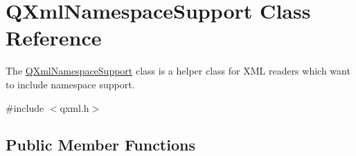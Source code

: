 \hypertarget{class_q_xml_namespace_support}{}\section{Q\+Xml\+Namespace\+Support Class Reference}
\label{class_q_xml_namespace_support}


The \mbox{\hyperlink{class_q_xml_namespace_support}{Q\+Xml\+Namespace\+Support}} class is a helper class for X\+ML readers which want to include namespace support.  




{\ttfamily \#include $<$qxml.\+h$>$}

\subsection*{Public Member Functions}
